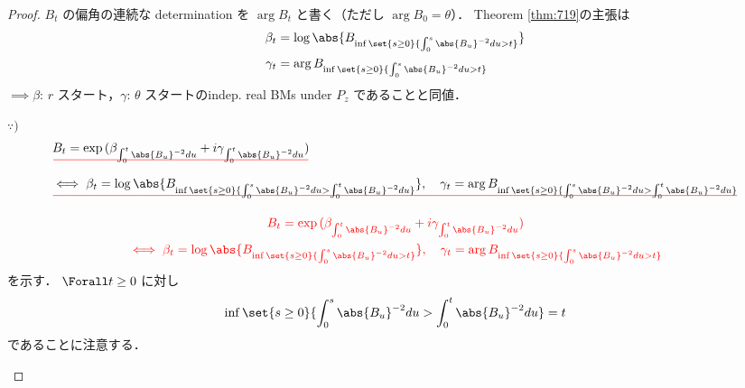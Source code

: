 \documentclass{jsarticle}
\newcommand\erase{\bgroup\markoverwith{\textcolor{red}{\rule[.5ex]{2pt}{0.4pt}}}\ULon} %
\providecommand{\DIFadd}[1]{{\protect\color{red}{#1}}} %
\providecommand{\DIFdel}[1]{{\protect\erase{#1}}}               %
\providecommand{\DIFaddbegin}{} %
\providecommand{\DIFaddend}{} %
\providecommand{\DIFdelbegin}{} %
\providecommand{\DIFdelend}{} %
\begin{document}
\begin{proof}
    $B_t$ の偏角の連続な determination \DIFdelbegin %
\DIFdelend を $\arg B_t$ と書く（ただし $\arg B_0=\theta$）．
    Theorem \ref{thm:719}の主張は
    \begin{align}
        \beta_t
        &= \log\abs{B_{\inf\set{s\ge0}{\int_0^s\abs{B_u}^{-2}du>t}}} \\
        \gamma_t
        &= \arg B_{\inf\set{s\ge0}{\int_0^s\abs{B_u}^{-2}du>t}}
    \end{align}
    $\implies \beta$: $r$ スタート，$\gamma$: $\theta$ スタートのindep. real BMs under $P_z$ であることと同値．

    \begin{screen}
        $\because)$
        \DIFdelbegin \begin{align*}
            &\DIFdel{B_t=\exp{(\beta_{\int_0^t\abs{B_u}^{-2}du}
            + i\gamma_{\int_0^t\abs{B_u}^{-2}du})} }\\
            &\DIFdel{\iff \beta_t
            = \log\abs{B_{\inf\set{s\ge0}{\int_0^s\abs{B_u}^{-2}du>\int_0^t\abs{B_u}^{-2}du}}},\quad
            \gamma_t
            = \arg B_{\inf\set{s\ge0}{\int_0^s\abs{B_u}^{-2}du>\int_0^t\abs{B_u}^{-2}du}}
        }\end{align*}%
\DIFdelend \DIFaddbegin \begin{gather}
            \DIFadd{B_t=\exp{(\beta_{\int_0^t\abs{B_u}^{-2}du}
            + i\gamma_{\int_0^t\abs{B_u}^{-2}du})} }\\
            \DIFadd{\iff \beta_t
            = \log\abs{B_{\inf\set{s\ge0}{\int_0^s\abs{B_u}^{-2}du>t}}},\quad
            \gamma_t
            = \arg B_{\inf\set{s\ge0}{\int_0^s\abs{B_u}^{-2}du>t}}
        }\end{gather}\DIFaddend 
        を示す．
        $\Forall t\ge0$ に対し
        $$
        \inf\set{s\ge0}{\int_0^s\abs{B_u}^{-2}du>\int_0^t\abs{B_u}^{-2}du} = t
        $$
        であることに注意する．


\end{screen}
\end{proof}
\end{document}
